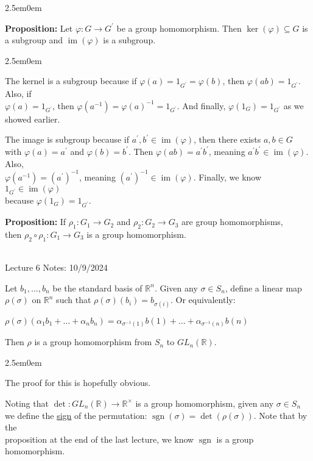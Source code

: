 \documentclass{book}
\newcommand{\hTwo}{%
\color{MidnightBlue}%
   \fontsize{13}{15}\selectfont%
}
\newcommand{\hThree}{%
   \color{PineGreen!85!Orange}
   \fontsize{12}{14}\selectfont%
}
\newenvironment{myIndent}{%
   \begin{adjustwidth}{2.5em}{0em}%
}{%
   \end{adjustwidth}%
}
\newcommand{\udefine}[1]{{%
   \setulcolor{Red}%
   \setul{0.14em}{0.07em}%
   \ul{#1}%
}}
\newcommand{\blab}[1]{\textbf{#1}}
\DeclareMathOperator{\im}{im}
\DeclareMathOperator{\sgn}{sgn}
\newcommand{\mySepTwo}[1][.]{%
   {\noindent\color{#1}{\rule{6.5in}{0.5mm}}}\\%
}
\newcommand{\retTwo}{\hfill\bigbreak}
\newcommand{\mHeader}[1]{{
   \color{Black}%
   \fontsize{20}{18}\selectfont%
   #1\retTwo
}}
\begin{document}
\begin{myIndent}\hTwo
	\blab{Proposition:} Let $\varphi: G \longrightarrow G^\prime$ be a group homomorphism. Then $\ker(\varphi) \subseteq G$ is a subgroup and $\im(\varphi)$ is a subgroup.
	
	\begin{myIndent}\hThree
		The kernel is a subgroup because if $\varphi(a) = 1_{G^\prime} = \varphi(b)$, then $\varphi(ab) = 1_{G^\prime}$. Also, if\\ $\varphi(a) = 1_{G^\prime}$, then $\varphi(a^{-1}) = \varphi(a)^{-1} = 1_{G^\prime}$. And finally, $\varphi(1_G) = 1_{G^\prime}$ as we showed earlier.\retTwo

		The image is subgroup because if $a^\prime, b^\prime \in \im(\varphi)$, then there exists $a, b \in G$ with $\varphi(a) = a^\prime$ and $\varphi(b) = b^\prime$. Then $\varphi(ab) = a^\prime b^\prime$, meaning $a^\prime b^\prime \in \im(\varphi)$. Also,\\ $\varphi(a^{-1}) = (a^\prime)^{-1}$, meaning $(a^\prime)^{-1} \in \im(\varphi)$. Finally, we know $1_{G^\prime} \in \im(\varphi)$\\ because $\varphi(1_G) = 1_{G^\prime}$.\retTwo
	\end{myIndent}

	\blab{Proposition:} If $\rho_1: G_1 \longrightarrow G_2$ and $\rho_2: G_2 \longrightarrow G_3$ are group homomorphisms,\\ then $\rho_2 \circ \rho_1: G_1 \longrightarrow G_3$ is a group homomorphism.
\end{myIndent}

\mySepTwo

\mHeader{Lecture 6 Notes: 10/9/2024}

Let $b_1, \ldots, b_n$ be the standard basis of $\mathbb{R}^n$. Given any $\sigma \in S_n$, define a linear map $\rho(\sigma)$ on $\mathbb{R}^n$ such that $\rho(\sigma)(b_i) = b_{\sigma(i)}$. Or equivalently:

{\centering $\rho(\sigma)(\alpha_1b_1 + \ldots + \alpha_nb_n) = \alpha_{\sigma^{-1}(1)}b(1) + \ldots + \alpha_{\sigma^{-1}(n)}b(n)$ \retTwo\par}

Then $\rho$ is a group homomorphism from $S_n$ to $GL_n(\mathbb{R})$.
\begin{myIndent}\hTwo
	The proof for this is hopefully obvious.\retTwo
\end{myIndent}

Noting that $\det: GL_n(\mathbb{R}) \longrightarrow \mathbb{R}^{\times}$ is a group homomorphism, given any $\sigma \in S_n$\\ we define the \udefine{sign} of the permutation: $\sgn(\sigma) = \det(\rho(\sigma))$. Note that by the\\ proposition at the end of the last lecture, we know $\sgn$ is a group homomorphism.
\end{document}
